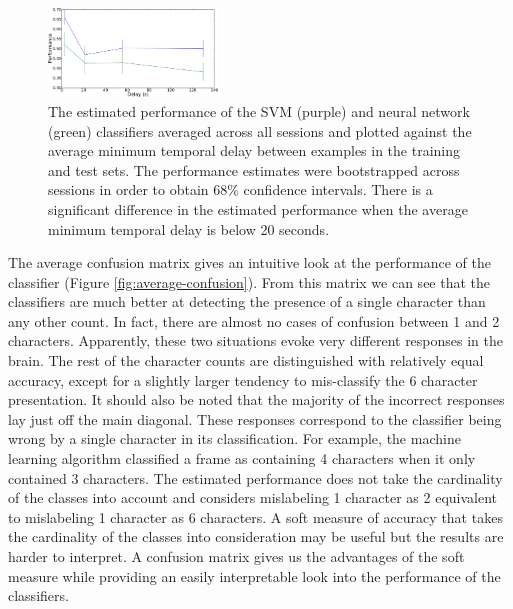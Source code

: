 \documentclass[preprint,5p,authoryear]{elsarticle}
\begin{document}
\begin{figure}
\centering
\includegraphics[width=0.4\textwidth]{figures/performance-verse-temporal-distance}
\caption{The estimated performance of the SVM (purple) and neural network (green) classifiers averaged across all sessions and plotted against the average minimum temporal delay between examples in the training and test sets. 
The performance estimates were bootstrapped across sessions in order to obtain 68\% confidence intervals.
There is a significant difference in the estimated performance when the average minimum temporal delay is below 20 seconds.}
\label{fig:performance-verse-temporal-distance}
\end{figure}

The average confusion matrix gives an intuitive look at the performance of the classifier (Figure \ref{fig:average-confusion}).
From this matrix we can see that the classifiers are much better at detecting the presence of a single character than any other count.
In fact, there are almost no cases of confusion between 1 and 2 characters.
Apparently, these two situations evoke very different responses in the brain.
The rest of the character counts are distinguished with relatively equal accuracy,
except for a slightly larger tendency to mis-classify the 6 character presentation.
It should also be noted that the majority of the incorrect responses lay just off the main diagonal.
These responses correspond to the classifier being wrong by a single character in its classification.
For example, the machine learning algorithm classified a frame as containing 4 characters when it only contained 3 characters.
The estimated performance does not take the cardinality of the classes into account and considers mislabeling 1 character as 2 equivalent to mislabeling 1 character as 6 characters.
A soft measure of accuracy that takes the cardinality of the classes into consideration may be useful but the results are harder to interpret.
A confusion matrix gives us the advantages of the soft measure while providing an easily interpretable look into the performance of the classifiers.
\end{document}
